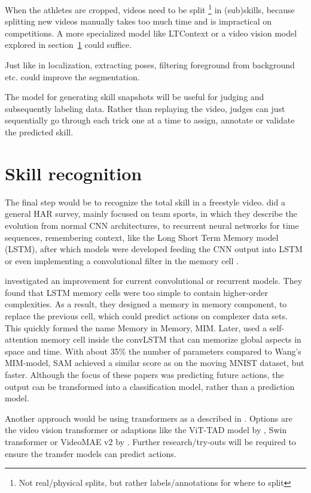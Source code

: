 When the athletes are cropped, videos need to be split \footnote{Not real/physical splits, but rather labels/annotations for where to split} in (sub)skills, because splitting new videos manually takes too much time and is impractical on competitions. A more specialized model like LTContext \autocite{Jiaming_2023} or a video vision model explored in section~\ref{lit:skill-recognition} could suffice.

Just like in localization, extracting poses, filtering foreground from background etc. could improve the segmentation.

The model for generating skill snapshots will
be useful for judging and subsequently labeling
data. Rather than replaying the video, judges can
just sequentially go through each trick one at a
time to assign, annotate or validate the predicted
skill.




\section{Skill recognition}
\label{lit:skill-recognition}

The final step would be to recognize the total skill in a freestyle video.
\textcite{Yin_2024} did a general HAR survey, mainly focused on team sports, in which they describe the evolution from normal CNN architectures, to recurrent neural networks for time sequences, remembering context, like the Long Short Term Memory model (LSTM), after which models were developed feeding the CNN output into LSTM or even implementing a convolutional filter in the memory cell \autocite{Shi_2015}.

\textcite{Wang_2019} investigated an improvement for current convolutional or recurrent models. They found that LSTM memory cells were too simple to contain higher-order complexities. As a result, they designed a memory in memory component, to replace the previous cell, which could predict actions on complexer data sets. This quickly formed the name Memory in Memory, MIM. Later, \textcite{Lin_2020} used a self-attention memory cell inside the convLSTM that can memorize global aspects in space and time. With about 35\% the number of parameters compared to Wang's MIM-model, SAM achieved a similar score as on the moving MNIST dataset, but faster. Although the focus of these papers was predicting future actions, the output can be transformed into a classification model, rather than a prediction model.

Another approach would be using transformers as a described  in \textcite{Yin_2024}. Options are the video vision transformer \autocite{Arnab2021} or adaptions like the ViT-TAD model by \textcite{Yang_2023}, Swin transformer \textcite{Liu_2021} or VideoMAE v2 by \textcite{Wang_2023}. Further research/try-outs will be required to ensure the transfer models can predict actions.

